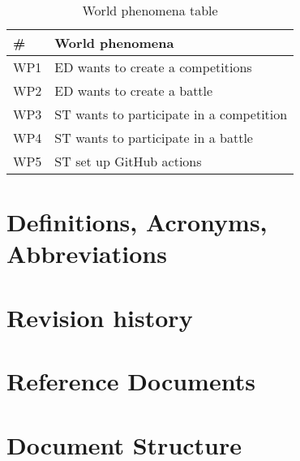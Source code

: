 \begin{table}[H]
  \begin{tabular}{|l|l|}

    \hline
    \textbf{\#} & \textbf{World phenomena}      \\
    \hline
    WP1 & ED wants to create a competitions \\
    \hline
    WP2 & ED wants to create a battle \\
    \hline
    WP3 & ST wants to participate in a competition \\
    \hline
    WP4 & ST wants to participate in a battle     \\
    \hline
    WP5 & ST set up GitHub actions    \\
    \hline
  \end{tabular}
  \caption{World phenomena table}
  \label{tab:worldPhenomena}
\end{table}


\section{Definitions, Acronyms, Abbreviations}
\label{s:Definitions_Acronyms_Abbreviations}%

\section{Revision history}
\label{s:Revision_history}%


\section{Reference Documents}
\label{s:Reference_documents}%

\section{Document Structure}
\label{s:Document_Structure}%

